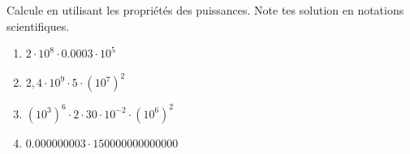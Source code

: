 %
%
  Calcule en utilisant les propriétés des puissances. Note tes solution en notations scientifiques.
  \begin{enumerate}[cols=2]
    \item $2 \cdot 10^{8} \cdot \num{0,0003}\cdot 10^{5}$
    \item $2,4 \cdot 10^{9} \cdot 5 \cdot \left( 10^{7} \right)^{2}$
    \item $\left( 10^{3} \right)^{6} \cdot 2 \cdot 30 \cdot 10^{- 2} \cdot \left( 10^{6} \right)^{2}$
    \item $\num{0,000000003} \cdot \num{150000000000000}$
  \end{enumerate}
